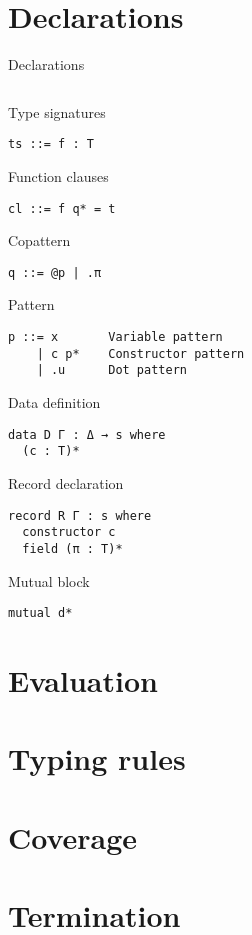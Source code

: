 \documentclass[acmlarge]{acmart}\settopmatter{}
\begin{document}
\section{Declarations}
\label{sec:declarations}

Declarations
\begin{verbatim}

\end{verbatim}

Type signatures
\begin{verbatim}
ts ::= f : T
\end{verbatim}

Function clauses
\begin{verbatim}
cl ::= f q* = t
\end{verbatim}

Copattern
\begin{verbatim}
q ::= @p | .π 
\end{verbatim}

Pattern
\begin{verbatim}
p ::= x       Variable pattern
    | c p*    Constructor pattern
    | .u      Dot pattern
\end{verbatim}

Data definition
\begin{verbatim}
data D Γ : Δ → s where 
  (c : T)*
\end{verbatim}

Record declaration
\begin{verbatim}
record R Γ : s where
  constructor c
  field (π : T)*
\end{verbatim}

Mutual block
\begin{verbatim}
mutual d*
\end{verbatim}


\section{Evaluation}
\label{sec:evaluation}

\section{Typing rules}
\label{sec:typing}

\section{Coverage}
\label{sec:coverage}

\section{Termination}
\label{sec:termination}
\end{document}
